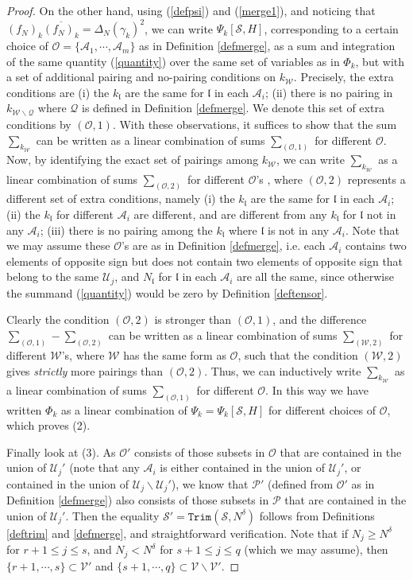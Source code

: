 \documentclass[11 pt,reqno]{amsart}
\theoremstyle{definition}
\theoremstyle{remark}
\numberwithin{equation}{section}
\newcommand{\Sc}{\mathcal{S}}
\newcommand{\Qc}{\mathcal{Q}}
\newcommand{\Uc}{\mathcal{U}}
\newcommand{\Ac}{\mathcal{A}}
\newcommand{\Vc}{\mathcal{V}}
\newcommand{\Wc}{\mathcal{W}}
\newcommand{\lf}{\mathfrak{l}}
\newcommand{\Ps}{\mathscr{P}}
\newcommand{\Os}{\mathscr{O}}
\newcommand{\Ws}{\mathscr{W}}
\begin{document}
{\begin{proof}
 On the other hand, using (\ref{defpsi}) and (\ref{merge1}), and noticing that $(f_N)_k\overline{(f_N)_k}=\Delta_N(\gamma_k)^2$, we can write $\Psi_k[\Sc,H]$, corresponding to a certain choice of $\Os=\{\Ac_1,\cdots,\Ac_m\}$ as in Definition \ref{defmerge}, as a sum and integration of the same quantity (\ref{quantity}) over the same set of variables as in $\Phi_k$, but with a set of additional pairing and no-pairing conditions on $k_\Wc$. Precisely, the extra conditions are (i) the $k_\lf$ are the same for $\lf$ in each $ \Ac_i$; (ii) there is no pairing in $k_{\Wc\backslash\Qc}$ where $\Qc$ is defined in Definition \ref{defmerge}. We denote this set of extra conditions by $(\Os,1)$. With these observations, it suffices to show that the sum $\sum_{k_{\Wc}}$ can be written as a linear combination of sums $\sum_{(\Os,1)}$ for different $\Os$. Now, by identifying the exact set of pairings among $k_{\Wc}$, we can write $\sum_{k_{\Wc}}$ as a linear combination of sums $\sum_{(\Os,2)}$ for different $\Os$'s , where $(\Os,2)$ represents a different set of extra conditions, namely (i) the $k_\lf$ are the same for $\lf$ in each $ \Ac_i$; (ii) the $k_\lf$ for different $\Ac_i$ are different, and are different from any $k_\lf$ for $\lf$ not in any $\Ac_i$; (iii) there is no pairing among the $k_\lf$ where $\lf$ is not in any $\Ac_i$. Note that we may assume these $\Os$'s are as in Definition \ref{defmerge}, i.e. each $\Ac_i$ contains two elements of opposite sign but does not contain two elements of opposite sign that belong to the same $\Uc_j$, and $N_\lf$ for $\lf$ in each $\Ac_i$ are all the same, since otherwise the summand (\ref{quantity}) would be zero by Definition \ref{deftensor}.
 
 Clearly the condition $(\Os,2)$ is stronger than $(\Os,1)$, and the difference $\sum_{(\Os,1)}-\sum_{(\Os,2)}$ can be written as a linear combination of sums $\sum_{(\Ws,2)}$ for different $\Ws$'s, where $\Ws$ has the same form as $\Os$, such that the condition $(\Ws,2)$ gives \emph{strictly} more pairings than $(\Os,2)$. Thus, we can inductively write $\sum_{k_{\Wc}}$ as a  linear combination of sums $\sum_{(\Os,1)}$ for different $\Os$. In this way we have written $\Phi_k$ as a linear combination of $\Psi_k=\Psi_k[\Sc,H]$ for different choices of $\Os$, which proves (2).
 
 Finally look at (3). As $\Os'$ consists of those subsets in $\Os$ that are contained in the union of $\Uc_j'$ (note that any $\Ac_i$ is either contained in the union of $\Uc_j'$, or contained in the union of $\Uc_j\backslash\Uc_j'$), we know that $\Ps'$ (defined from $\Os'$ as in Definition \ref{defmerge}) also consists of those subsets in $\Ps$ that are contained in the union of $\Uc_j'$. Then the equality $\Sc'=\mathtt{Trim}(\Sc,N^\delta)$ follows from Definitions \ref{deftrim} and \ref{defmerge}, and straightforward verification. Note that if $N_j\geq N^\delta$ for $r+1\leq j\leq s$, and $N_j<N^\delta $ for $s+1\leq j\leq q$ (which we may assume), then $\{r+1,\cdots,s\}\subset\Vc'$ and $\{s+1,\cdots,q\}\subset\Vc\backslash\Vc'$.
 

\end{proof}}
\end{document}
